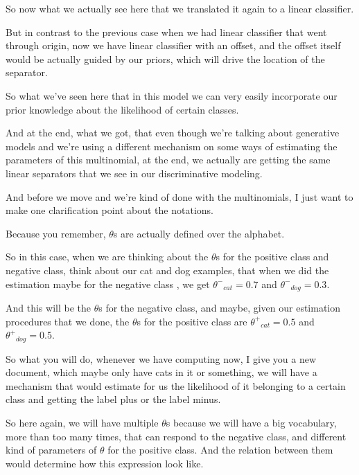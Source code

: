 \documentclass[a4paper, 12pt]{article}
\begin{document}
So now what we actually see here that we translated it again to a linear
classifier.

But in contrast to the previous case when we had linear classifier that went
through origin, now we have linear classifier with an offset, and the offset
itself would be actually guided by our priors, which will drive the location of
the separator.

So what we've seen here that in this model we can very easily incorporate our
prior knowledge about the likelihood of certain classes.

And at the end, what we got, that even though we're talking about generative
models and we're using a different mechanism on some ways of estimating the
parameters of this multinomial, at the end, we actually are getting the same
linear separators that we see in our discriminative modeling.

And before we move and we're kind of done with the multinomials, I just want to
make one clarification point about the notations.

Because you remember, \(\theta\)s are actually defined over the alphabet.

So in this case, when we are thinking about the \(\theta\)s for the positive
class and negative class, think about our cat and dog examples, that when we did
the estimation maybe for the negative class , we get \({\theta^{-}}_{cat}=0.7\) and
\({{\theta^{-}}_{dog}}=0.3\).

And this will be the \(\theta\)s for the negative class, and maybe, given our
estimation procedures that we done, the \(\theta\)s for the positive class are
\({\theta^{+}}_{cat}=0.5\) and \({{\theta^{+}}_{dog}}=0.5\).

So what you will do, whenever we have computing now, I give you a new document,
which maybe only have cats in it or something, we will have a mechanism that
would estimate for us the likelihood of it belonging to a certain class and
getting the label plus or the label minus.

So here again, we will have multiple \(\theta\)s because we will have a big
vocabulary, more than too many times, that can respond to the negative class,
and different kind of parameters of \(\theta\) for the positive class. And the
relation between them would determine how this expression look like.
\end{document}
